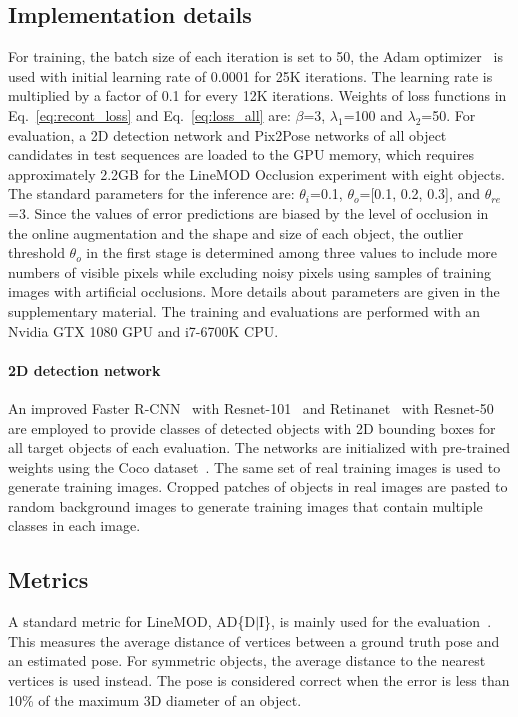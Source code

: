 \documentclass[10pt,twocolumn,letterpaper]{article}
\begin{document}
\subsection{Implementation details}
For training, the batch size of each iteration is set to 50, the Adam optimizer~\cite{kingma2014adam} is used with initial learning rate of 0.0001 for 25K iterations. The learning rate is multiplied by a factor of 0.1 for every 12K iterations. Weights of loss functions in Eq.~\ref{eq:recont_loss} and Eq.~\ref{eq:loss_all} are: $\beta$=3, $\lambda_1$=100 and $\lambda_2$=50.
For evaluation, a 2D detection network and Pix2Pose networks of all object candidates in test sequences are loaded to the GPU memory, which requires approximately 2.2GB for the LineMOD Occlusion experiment with eight objects. The standard parameters for the inference are: $\theta_i$=0.1, $\theta_{o}$=[0.1, 0.2, 0.3], and $\theta_{re}$=3. Since the values of error predictions are biased by the level of occlusion in the online augmentation and the shape and size of each object, the outlier threshold $\theta_o$ in the first stage is determined among three values to include more numbers of visible pixels while excluding noisy pixels using samples of training images with artificial occlusions. More details about parameters are given in the supplementary material. The training and evaluations are performed with an Nvidia GTX 1080 GPU and i7-6700K CPU.   

\paragraph{2D detection network}
An improved Faster R-CNN~\cite{he2017mask,cnn:fastercnn} with Resnet-101~\cite{he2016deep_resnet} and Retinanet~\cite{Lin_2017_ICCV_retinanet} with Resnet-50 are employed to provide classes of detected objects with 2D bounding boxes for all target objects of each evaluation. The networks are initialized with pre-trained weights using the Coco dataset~\cite{lin2014mscoco}.  The same set of real training images is used to generate training images. Cropped patches of objects in real images are pasted to random background images to generate training images that contain multiple classes in each image.


\subsection{Metrics}
A standard metric for LineMOD, AD\{D$\vert$I\}, is mainly used for the evaluation~\cite{linemode_hinterstoisser2012}. This measures the average distance of vertices between a ground truth pose and an estimated pose. For symmetric objects, the average distance to the nearest vertices is used instead. The pose is considered correct when the error is less than 10\% of the maximum 3D diameter of an object. 
  
\end{document}
